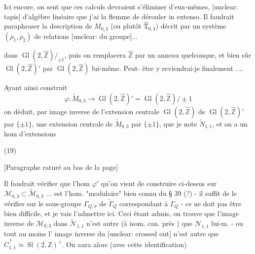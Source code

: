 \begin{enumerate}
Ici encore, on sent que ces calculs devraient s'éliminer d'eux-mêmes, [unclear: tapis] d'algèbre linéaire que j'ai la flemme de dérouler in extenso. Il faudrait paraphraser la description de $M_{0,3}$ (ou plutôt $\hat{\mathfrak{T}}_{0,3}$) décrit par un système $(\rho_1, \rho_2)$ de relations [unclear: du groupe]...

\newpage


dans $\operatorname{Gl}(2, \hat{\mathbb{Z}})/_{\pm 1}$, puis on remplacera $\hat{\mathbb{Z}}$ par
un anneau quelconque, et bien sûr
$\operatorname{Gl}(2, \hat{\mathbb{Z}})'$ par $\operatorname{Gl}(2, \hat{\mathbb{Z}})$ lui-même. Peut-
être y reviendrai-je finalement ....

Ayant ainsi construit
$$ \varphi : \widetilde{M}_{0,3} \longrightarrow \operatorname{Gl}(2, \hat{\mathbb{Z}})' = \operatorname{Gl}(2, \hat{\mathbb{Z}})/\pm 1 $$
on déduit, par image inverse de l'extension
centrale $\operatorname{Gl}(2, \hat{\mathbb{Z}})$ de $\operatorname{Gl}(2, \hat{\mathbb{Z}})'$ par $\{\pm 1\}$, une
extension centrale de $\widetilde{M}_{0,3}$ par $\{\pm 1\}$,
que je note $\widetilde{N}_{1,1}$, et on a
un hom d'extensions

(19)

[Paragraphe raturé au bas de la page]

\newpage


Il faudrait vérifier que l'hom $\varphi'$
qu'on vient de construire ci-dessus sur
$\mathcal{M}_{0,3} \subset \tilde{\mathcal{M}}_{0,3}$ ... est l'hom. "modulaire"
bien connu du § 39 (?) - il suffit
de le vérifier sur le sous-groupe
$\Gamma_{Q,\sigma}$ de $\tilde{\Gamma}_Q$ correspondant à $\Gamma_Q$ -
ce ne doit pas être bien difficile, et
je vais l'admettre ici. Ceci étant
admis, on trouve que l'image
inverse de $\mathcal{M}_{0,3}$ dans $\tilde{\mathcal{N}}_{1,1}$ n'est
autre (à isom. can. près ) que
$\mathcal{N}_{1,1}$ lui-m. - ou tout au moins l'
image inverse du [unclear: crossed out] n'est
autre que $\widehat{C}_{1,1}^+ \simeq \operatorname{Sl}(2,\mathbb{Z})^\wedge$. On aura alors
(avec cette identification)


\end{enumerate}

